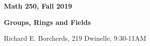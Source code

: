 \documentclass[12pt,letterpaper]{article}
\begin{document}
\thispagestyle{empty}
$ $
\vfill
\begin{center}

\centerline{\huge \textbf{Math 250, Fall 2019}}
\centerline{\Large \textbf{Groups, Rings and Fields}} 
\centerline{Richard E. Borcherds, 219 Dwinelle, 9:30-11AM}
\end{center}
\vfill
$ $
\newpage
\thispagestyle{empty}
\tableofcontents
\newpage
\setcounter{page}{1}

\end{document}
